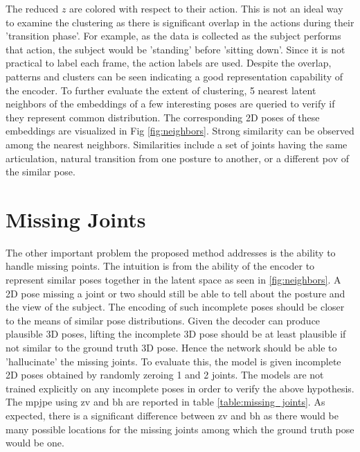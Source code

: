 The reduced $z$ are colored with respect to their action. This is not an ideal way to examine the clustering as there is significant overlap in the actions during their 'transition phase'. For example, as the data is collected as the subject performs that action, the subject would be 'standing' before 'sitting down'. Since it is not practical to label each frame, the action labels are used. Despite the overlap, patterns and clusters can be seen indicating a good representation capability of the encoder. To further evaluate the extent of clustering, 5 nearest latent neighbors of the embeddings of a few interesting poses are queried to verify if they represent common distribution. The corresponding 2D poses of these embeddings are visualized in Fig \ref{fig:neighbors}. Strong similarity can be observed among the nearest neighbors. Similarities include a set of joints having the same articulation, natural transition from one posture to another, or a different \ac{pov} of the similar pose. 




\section{Missing Joints}
The other important problem the proposed method addresses is the ability to handle missing points. The intuition is from the ability of the encoder to represent similar poses together in the latent space as seen in \ref{fig:neighbors}. A 2D pose missing a joint or two should still be able to tell about the posture and the view of the subject. The encoding of such incomplete poses should be closer to the means of similar pose distributions. Given the decoder can produce plausible 3D poses, lifting the incomplete 3D pose should be at least plausible if not similar to the ground truth 3D pose. Hence the network should be able to 'hallucinate' the missing joints. To evaluate this, the model is given incomplete 2D poses obtained by randomly zeroing 1 and 2 joints. The models are not trained explicitly on any incomplete poses in order to verify the above hypothesis. The \ac{mpjpe} using \ac{zv} and \ac{bh} are reported in table \ref{table:missing_joints}. As expected, there is a significant difference between \ac{zv} and \ac{bh} as there would be many possible locations for the missing joints among which the ground truth pose would be one.

